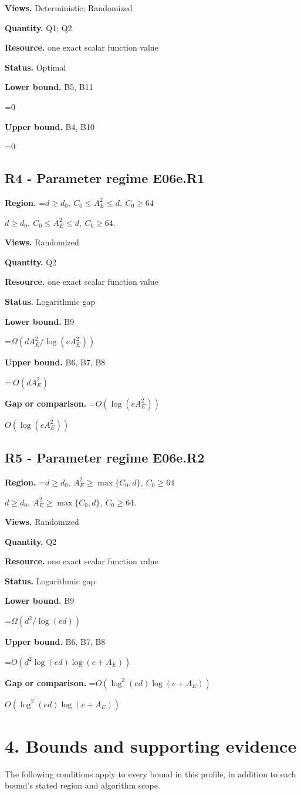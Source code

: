 \documentclass[10pt,a4paper]{article}
\newcommand{\AtlasMath}[1]{\par\begingroup\centering\setbox0=\hbox{$\displaystyle #1$}\ifdim\wd0>1.4\linewidth\typeout{ATLAS WIDE FORMULA: \the\wd0}\fi\ifdim\wd0>\linewidth\resizebox{\linewidth}{!}{\box0}\else\box0\fi\par\endgroup}
\newcommand{\AtlasInlineMath}[1]{\begingroup\setbox0=\hbox{$#1$}\ifdim\wd0>.4\linewidth\endgroup\AtlasMath{#1}\else\endgroup$#1$\fi}
\begin{document}
\textbf{Views.} Deterministic; Randomized

\textbf{Quantity.} Q1; Q2

\textbf{Resource.} one exact scalar function value

\textbf{Status.} Optimal

\textbf{Lower bound.} B5, B11

\AtlasMath{0}
\textbf{Upper bound.} B4, B10

\AtlasMath{0}
\subsection{R4 - Parameter regime E06e.R1}
\textbf{Region.} \AtlasInlineMath{d\ge d_0,\ C_0\le A_E^2\le d,\ C_0\ge64}.

\textbf{Views.} Randomized

\textbf{Quantity.} Q2

\textbf{Resource.} one exact scalar function value

\textbf{Status.} Logarithmic gap

\textbf{Lower bound.} B9

\AtlasMath{\Omega(dA_E^2/\log(eA_E^2))}
\textbf{Upper bound.} B6, B7, B8

\AtlasMath{\ O(dA_E^2)}
\textbf{Gap or comparison.} \AtlasInlineMath{O(\log(eA_E^2))}

\subsection{R5 - Parameter regime E06e.R2}
\textbf{Region.} \AtlasInlineMath{d\ge d_0,\ A_E^2\ge\max\{C_0,d\},\ C_0\ge64}.

\textbf{Views.} Randomized

\textbf{Quantity.} Q2

\textbf{Resource.} one exact scalar function value

\textbf{Status.} Logarithmic gap

\textbf{Lower bound.} B9

\AtlasMath{\Omega(d^2/\log(ed))}
\textbf{Upper bound.} B6, B7, B8

\AtlasMath{O(d^2\log(ed)\log(e+A_E))}
\textbf{Gap or comparison.} \AtlasInlineMath{O(\log^2(ed)\log(e+A_E))}

\section{4. Bounds and supporting evidence}
The following conditions apply to every bound in this profile, in addition to each bound's stated region and algorithm scope.
\end{document}
